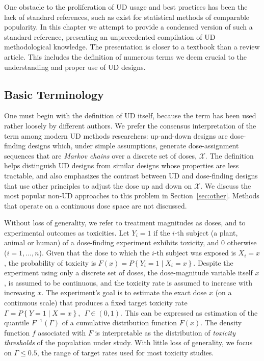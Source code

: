 One obstacle to the proliferation of UD usage and best practices has been the lack of standard references, such as exist for statistical methods of comparable popularity.  In this chapter we attempt to provide a condensed version of such a standard reference, presenting an unprecedented compilation of UD methodological knowledge. The presentation is closer to a textbook than a review article. This includes the definition of numerous terms we deem crucial to the understanding and proper use of UD designs.


\subsection{Basic Terminology}\label{sec:terminol}

One must begin with the definition of UD itself, because the term has been used rather loosely by different authors. We prefer the consensus interpretation of the term among modern UD methods researchers: up-and-down designs are dose-finding designs which, under simple assumptions, generate dose-assignment sequences that are \emph{Markov chains} over a discrete set of doses, $\mathcal{X}$. The definition helps distinguish UD designs from similar designs whose properties are less tractable, and also emphasizes the contrast between UD and dose-finding designs that use other principles to adjust the dose up and down on $\mathcal{X}$. We discuss the most popular non-UD approaches to this problem in Section~\ref{sec:other}. Methods that operate on a continuous dose space are not discussed.

Without loss of generality, we refer to treatment magnitudes as doses, and to experimental outcomes as toxicities. Let $Y_i = 1$ if the $i$-th subject (a plant, animal or human) of a dose-finding experiment exhibits toxicity, and $0$ otherwise ($i=1,\ldots ,n$). Given that the dose to which the $i$-th subject was exposed is $X_i=x$, the probability of toxicity is $F(x) = P\left\{Y_i=1\mid X_i =x\right\}$. Despite the experiment using only a discrete set of doses, the dose-magnitude variable itself $x$, is assumed to be continuous, and the toxicity rate is assumed to increase with increasing $x$.  The experiment's goal is to estimate the exact dose $x$ (on a continuous scale) that produces a fixed target toxicity rate $\Gamma=P\left\{Y=1\mid X=x\right\}, \ \ \Gamma\in(0,1)$. This can be expressed as estimation of the quantile  $F^{-1}(\Gamma)$ of a cumulative distribution function $F(x)$.  The density function $f$ associated with $F$ is interpretable as the distribution of \emph{toxicity thresholds} of the population under study. With little loss of generality, we focus on $\Gamma\leq 0.5$, the range of target rates used for most toxicity studies.

